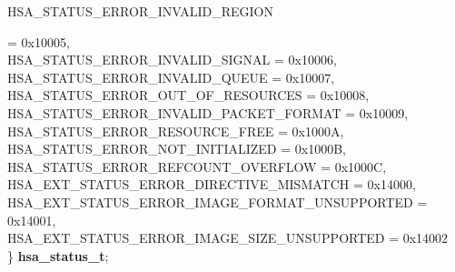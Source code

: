 \documentclass[final]{book}
\newcommand{\reftyp}[1]{#1}
\newcommand{\refenu}[1]{\reftyp{#1}}
\newenvironment{mylongtable}{\rowcolors{0}{lightgray}{lightgray}\longtable} {
\endlongtable}
\begin{document}
\begin{mylongtable}{@{}p{\textwidth}}
\hspace{1.7em}\hypertarget{group__status_1ggad755322e7ff95456520e8abdbe90d225ad63594ac02edec7ae7aa7722c11afcd9}{\refenu{HSA_\-STATUS_\-ERROR_\-INVALID_\-REGION}} = 0x10005,\\
\hspace{1.7em}\hypertarget{group__status_1ggad755322e7ff95456520e8abdbe90d225a7b4c8c0d4c99a1fe966abc2d39b575fe}{\refenu{HSA_\-STATUS_\-ERROR_\-INVALID_\-SIGNAL}} = 0x10006,\\
\hspace{1.7em}\hypertarget{group__status_1ggad755322e7ff95456520e8abdbe90d225aa3c762eb6a61b358702b45259d1686c4}{\refenu{HSA_\-STATUS_\-ERROR_\-INVALID_\-QUEUE}} = 0x10007,\\
\hspace{1.7em}\hypertarget{group__status_1ggad755322e7ff95456520e8abdbe90d225a1a77fcf36d0d140874c4361ab093eff7}{\refenu{HSA_\-STATUS_\-ERROR_\-OUT_\-OF_\-RESOURCES}} = 0x10008,\\
\hspace{1.7em}\hypertarget{group__status_1ggad755322e7ff95456520e8abdbe90d225a3fad45f72111eb99de5d8daef26c372c}{\refenu{HSA_\-STATUS_\-ERROR_\-INVALID_\-PACKET_\-FORMAT}} = 0x10009,\\
\hspace{1.7em}\hypertarget{group__status_1ggad755322e7ff95456520e8abdbe90d225a6406af88203fcbec4179fbb71cc66b65}{\refenu{HSA_\-STATUS_\-ERROR_\-RESOURCE_\-FREE}} = 0x1000A,\\
\hspace{1.7em}\hypertarget{group__status_1ggad755322e7ff95456520e8abdbe90d225a34ea59ade5bfce95eee935238a99f5b5}{\refenu{HSA_\-STATUS_\-ERROR_\-NOT_\-INITIALIZED}} = 0x1000B,\\
\hspace{1.7em}\hypertarget{group__status_1ggad755322e7ff95456520e8abdbe90d225aa9218eed04d1d2ffc5ed8f33f2cd1c9b}{\refenu{HSA_\-STATUS_\-ERROR_\-REFCOUNT_\-OVERFLOW}} = 0x1000C,\\
\hspace{1.7em}\hypertarget{group__status_1ggad755322e7ff95456520e8abdbe90d225ae16bcc443d027a0b880fd58f0443227b}{\refenu{HSA_\-EXT_\-STATUS_\-ERROR_\-DIRECTIVE_\-MISMATCH}} = 0x14000,\\
\hspace{1.7em}\hypertarget{group__status_1ggad755322e7ff95456520e8abdbe90d225a42108181943a2d94749d95dc7942b7d0}{\refenu{HSA_\-EXT_\-STATUS_\-ERROR_\-IMAGE_\-FORMAT_\-UNSUPPORTED}} = 0x14001,\\
\hspace{1.7em}\hypertarget{group__status_1ggad755322e7ff95456520e8abdbe90d225a3ff898da367040b1f382c14c9f0a1bab}{\refenu{HSA_\-EXT_\-STATUS_\-ERROR_\-IMAGE_\-SIZE_\-UNSUPPORTED}} = 0x14002\\
\} \hypertarget{group__status_1gad755322e7ff95456520e8abdbe90d225}{\textbf{hsa_\-status_\-t}};\rule[-2ex]{0pt}{0pt}\end{mylongtable}
\vspace{-2mm}
\end{document}
